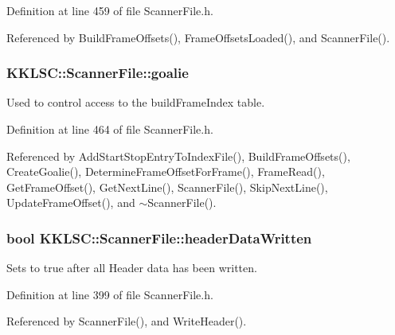 Definition at line 459 of file Scanner\+File.\+h.



Referenced by Build\+Frame\+Offsets(), Frame\+Offsets\+Loaded(), and Scanner\+File().

\subsubsection[{\texorpdfstring{goalie}{goalie}}]{ K\+K\+L\+S\+C\+::\+Scanner\+File\+::goalie\hspace{0.3cm}{\ttfamily [protected]}}\hypertarget{class_k_k_l_s_c_1_1_scanner_file_aea946a2d0dc2fb27b41ce5180679d3de}{}\label{class_k_k_l_s_c_1_1_scanner_file_aea946a2d0dc2fb27b41ce5180679d3de}
Used to control access to the build\+Frame\+Index table. 

Definition at line 464 of file Scanner\+File.\+h.



Referenced by Add\+Start\+Stop\+Entry\+To\+Index\+File(), Build\+Frame\+Offsets(), Create\+Goalie(), Determine\+Frame\+Offset\+For\+Frame(), Frame\+Read(), Get\+Frame\+Offset(), Get\+Next\+Line(), Scanner\+File(), Skip\+Next\+Line(), Update\+Frame\+Offset(), and $\sim$\+Scanner\+File().

\subsubsection[{\texorpdfstring{header\+Data\+Written}{headerDataWritten}}]{\setlength{\rightskip}{0pt plus 5cm}bool K\+K\+L\+S\+C\+::\+Scanner\+File\+::header\+Data\+Written\hspace{0.3cm}{\ttfamily [protected]}}\hypertarget{class_k_k_l_s_c_1_1_scanner_file_af07a14225690ce6ff6c2a9194323f0d4}{}\label{class_k_k_l_s_c_1_1_scanner_file_af07a14225690ce6ff6c2a9194323f0d4}
Sets to true after all Header data has been written. 

Definition at line 399 of file Scanner\+File.\+h.



Referenced by Scanner\+File(), and Write\+Header().

